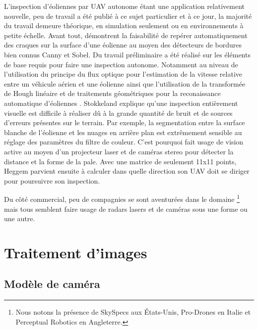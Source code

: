 L'inspection d'éoliennes par UAV autonome étant une application relativement nouvelle, peu de travail a été publié à ce sujet particulier et à ce jour, la majorité du travail demeure théorique, en simulation seulement ou en environnements à petite échelle. Avant tout, \citep{Zhang2014} démontrent la faisabilité de repérer automatiquement des craques sur la surface d'une éolienne au moyen des détecteurs de bordures bien connus Canny et Sobel. Du travail préliminaire a été réalisé sur les éléments de base requis pour faire une inspection autonome. Notamment au niveau de l'utilisation du principe du flux optique pour l'estimation de la vitesse relative entre un véhicule aérien et une éolienne \citep{Hoglund2014} ainsi que l'utilisation de la transformée de Hough linéaire et de traitements géométriques pour la reconaissance automatique d'éoliennes \citep{Stokkeland2015}. Stokkeland explique qu'une inspection entièrement visuelle est difficile à réaliser dû à la grande quantité de bruit et de sources d'erreurs présentes sur le terrain. Par exemple, la segmentation entre la surface blanche de l'éolienne et les nuages en arrière plan est extrêmement sensible au réglage des paramètres du filtre de couleur. C'est pourquoi \citep{Heggem2017} fait usage de vision active au moyen d'un projecteur laser et de caméras stereo pour détecter la distance et la forme de la pale. Avec une matrice de seulement 11x11 points, Heggem parvient ensuite à calculer dans quelle direction son UAV doit se diriger pour poursuivre son inspection.

Du côté commercial, peu de compagnies se sont aventurées dans le domaine \footnote{Nous notons la présence de SkySpecs aux États-Unis, Pro-Drones en Italie et Perceptual Robotics en Angleterre.} mais tous semblent faire usage de radars lasers et de caméras sous une forme ou une autre.

\section{Traitement d'images}

\subsection{Modèle de caméra}
\label{subsec:modele_camera}

